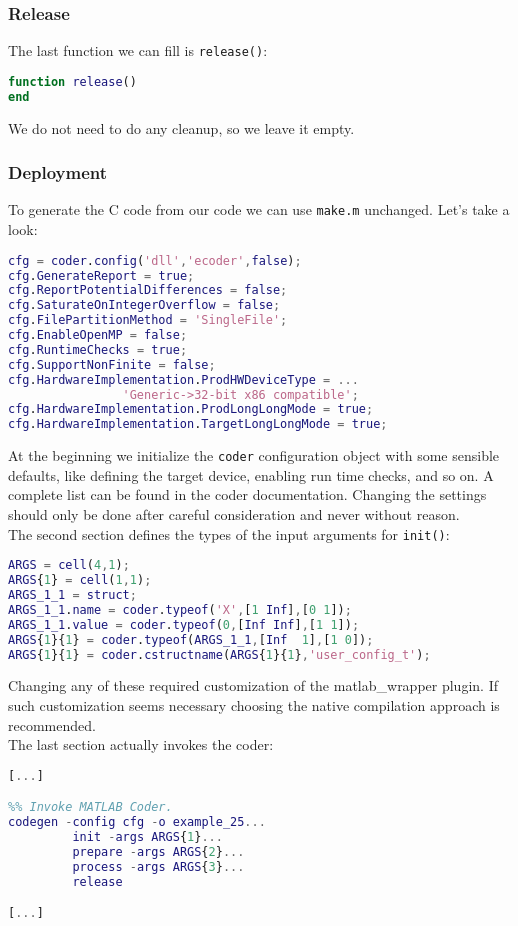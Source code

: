 \documentclass[11pt,a4paper,twoside]{article}
\newcommand{\+}{\discretionary{\mbox{\scriptsize$\hookleftarrow$}}{}{}}
\begin{document}
\subsubsection*{Release}
The last function we can fill is \texttt{release()}:
\begin{lstlisting}[language=Matlab]
function release()
end
\end{lstlisting}
We do not need to do any cleanup, so we leave it empty.
\subsubsection*{Deployment}
To generate the C code from our \Matlab{} code we can use \texttt{make.m}
unchanged. Let's take a look:
\begin{lstlisting}[language=Matlab]
%% Create configuration object of class 'coder.CodeConfig'.
cfg = coder.config('dll','ecoder',false);
cfg.GenerateReport = true;
cfg.ReportPotentialDifferences = false;
cfg.SaturateOnIntegerOverflow = false;
cfg.FilePartitionMethod = 'SingleFile';
cfg.EnableOpenMP = false;
cfg.RuntimeChecks = true;
cfg.SupportNonFinite = false;
cfg.HardwareImplementation.ProdHWDeviceType = ...
                'Generic->32-bit x86 compatible';
cfg.HardwareImplementation.ProdLongLongMode = true;
cfg.HardwareImplementation.TargetLongLongMode = true;
\end{lstlisting}
At the beginning we initialize the \texttt{coder} configuration object with some sensible
defaults, like defining the target device, enabling run time checks, and so on.
A complete list can be found in the \Matlab{} coder documentation. Changing the
settings should only be done after careful consideration and never without
reason. \\
The second section defines the types of the input arguments for \texttt{init()}:
\begin{lstlisting}[language=Matlab]
%% Define argument types for entry-point 'init'.
ARGS = cell(4,1);
ARGS{1} = cell(1,1);
ARGS_1_1 = struct;
ARGS_1_1.name = coder.typeof('X',[1 Inf],[0 1]);
ARGS_1_1.value = coder.typeof(0,[Inf Inf],[1 1]);
ARGS{1}{1} = coder.typeof(ARGS_1_1,[Inf  1],[1 0]);
ARGS{1}{1} = coder.cstructname(ARGS{1}{1},'user_config_t');
\end{lstlisting}
Changing any of these required customization of the matlab\_wrapper plugin. If
such customization seems necessary choosing the native compilation approach is
recommended. \\
The last section actually invokes the \Matlab{} coder:
\begin{lstlisting}[language=Matlab]
[...]

%% Invoke MATLAB Coder.
codegen -config cfg -o example_25... 
         init -args ARGS{1}...
         prepare -args ARGS{2}...
         process -args ARGS{3}...
         release

[...]

\end{lstlisting}
\end{document}
